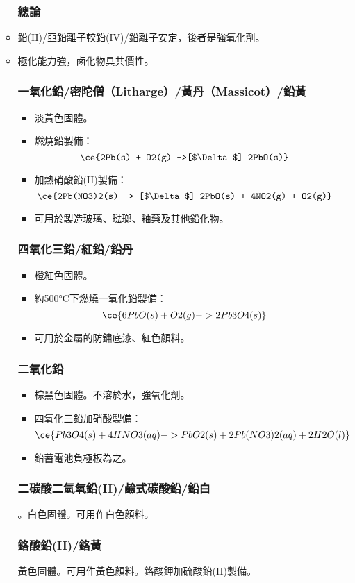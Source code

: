 \documentclass[a4paper,12pt]{report}
\begin{document}
\begin{itemize}
\begin{itemize}
\subsubsection{總論}
\bit
\item 鉛(II)/亞鉛離子較鉛(IV)/鉛離子安定，後者是強氧化劑。
\item {}極化能力強，鹵化物具共價性。
\eit
\subsubsection{一氧化鉛/密陀僧（Litharge）/黃丹（Massicot）/鉛黃}
\begin{itemize}
\item 淡黃色固體。
\item 燃燒鉛製備：
\[\ce{2Pb(s) + O2(g) ->[$\Delta$] 2PbO(s)}\]
\item 加熱硝酸鉛(II)製備：
\[\ce{2Pb(NO3)2(s) -> [$\Delta$] 2PbO(s) + 4NO2(g) + O2(g)}\]
\item 可用於製造玻璃、琺瑯、釉藥及其他鉛化物。
\end{itemize}
\subsubsection{四氧化三鉛/紅鉛/鉛丹}
\begin{itemize}
\item 橙紅色固體。
\item 約500°C下燃燒一氧化鉛製備：
\[\ce{6PbO(s) + O2(g) -> 2Pb3O4(s)}\]
\item 可用於金屬的防鏽底漆、紅色顏料。
\end{itemize}
\subsubsection{二氧化鉛}
\begin{itemize}
\item 棕黑色固體。不溶於水，強氧化劑。
\item 四氧化三鉛加硝酸製備：
\[\ce{Pb3O4(s) + 4HNO3(aq) -> PbO2(s) + 2Pb(NO3)2(aq) + 2H2O(l)}\]
\item 鉛蓄電池負極板為之。
\end{itemize}
\subsubsection{二碳酸二氫氧鉛(II)/鹼式碳酸鉛/鉛白}
。白色固體。可用作白色顏料。
\subsubsection{鉻酸鉛(II)/鉻黃}
黃色固體。可用作黃色顏料。鉻酸鉀加硫酸鉛(II)製備。

\end{itemize}
\end{itemize}
\end{document}
